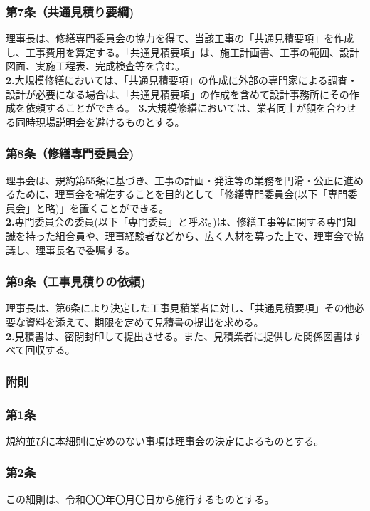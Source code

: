 \documentclass[12pt,uplatex]{jsarticle}
\begin{document}
\subsubsection*{ 第7条（共通見積り要綱)}
理事長は、修繕専門委員会の協力を得て、当該工事の「共通見積要項」を作成し、工事費用を算定する。「共通見積要項」は、施工計画書、工事の範囲、設計図面、実施工程表、完成検査等を含む。\\
\textbf{2.}大規模修繕においては、「共通見積要項」の作成に外部の専門家による調査・設計が必要になる場合は、「共通見積要項」の作成を含めて設計事務所にその作成を依頼することができる。
\textbf{3.}大規模修繕においては、業者同士が顔を合わせる同時現場説明会を避けるものとする。
\subsubsection*{ 第8条（修繕専門委員会)}
理事会は、規約第55条に基づき、工事の計画・発注等の業務を円滑・公正に進めるために、理事会を補佐することを目的として「修繕専門委員会(以下「専門委員会」と略)」を置くことができる。\\
\textbf{2.}専門委員会の委員(以下「専門委員」と呼ぶ。)は、修繕工事等に関する専門知識を持った組合員や、理事経験者などから、広く人材を募った上で、理事会で協議し、理事長名で委嘱する。
\subsubsection*{ 第9条（工事見積りの依頼)}
理事長は、第6条により決定した工事見積業者に対し、「共通見積要項」その他必要な資料を添えて、期限を定めて見積書の提出を求める。\\
\textbf{2.}見積書は、密閉封印して提出させる。また、見積業者に提供した関係図書はすべて回収する。





\begin{center}
\subsubsection*{附則}
\end{center}
\subsubsection*{第1条}
規約並びに本細則に定めのない事項は理事会の決定によるものとする。
\subsubsection*{第2条}
この細則は、令和〇〇年〇月〇日から施行するものとする。
\end{document}

